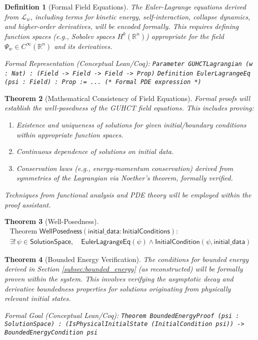 \documentclass[11pt,a4paper]{article}
\newtheorem{theorem}{Theorem}[section]
\newtheorem{definition}[theorem]{Definition}
\begin{document}
\begin{definition}[Formal Field Equations]
The Euler-Lagrange equations derived from $\mathcal{L}_w$, including terms for kinetic energy, self-interaction, collapse dynamics, and higher-order derivatives, will be encoded formally. This requires defining function spaces (e.g., Sobolev spaces $H^k(\mathbb{R}^n)$) appropriate for the field $\Psi_w \in C^\infty(\mathbb{R}^n)$ and its derivatives.

Formal Representation (Conceptual Lean/Coq):
\texttt{Parameter GUHCTLagrangian (w : Nat) : (Field -> Field -> Field -> Prop)}
\texttt{Definition EulerLagrangeEq (psi : Field) : Prop := ... (* Formal PDE expression *)}
\end{definition}

\begin{theorem}[Mathematical Consistency of Field Equations]
Formal proofs will establish the well-posedness of the GUHCT field equations. This includes proving:
\begin{enumerate}
    \item Existence and uniqueness of solutions for given initial/boundary conditions within appropriate function spaces.
    \item Continuous dependence of solutions on initial data.
    \item Conservation laws (e.g., energy-momentum conservation) derived from symmetries of the Lagrangian via Noether's theorem, formally verified.
\end{enumerate}
Techniques from functional analysis and PDE theory will be employed within the proof assistant.
\end{theorem}
\begin{theorem}[Well-Posedness]
\begin{align*}
\text{Theorem } \textsf{WellPosedness}(\textsf{initial\_data} : \textsf{InitialConditions}) : \\
\exists!\, \psi \in \textsf{SolutionSpace},\quad
\textsf{EulerLagrangeEq}(\psi) \land 
\textsf{InitialCondition}(\psi, \textsf{initial\_data})
\end{align*}

\end{theorem}


\begin{theorem}[Bounded Energy Verification]
The conditions for bounded energy derived in Section \ref{subsec:bounded_energy} (as reconstructed) will be formally proven within the system. This involves verifying the asymptotic decay and derivative boundedness properties for solutions originating from physically relevant initial states.

Formal Goal (Conceptual Lean/Coq):
\texttt{Theorem BoundedEnergyProof (psi : SolutionSpace) :
  (IsPhysicalInitialState (InitialCondition psi)) -> BoundedEnergyCondition psi}
\end{theorem}
\end{document}
